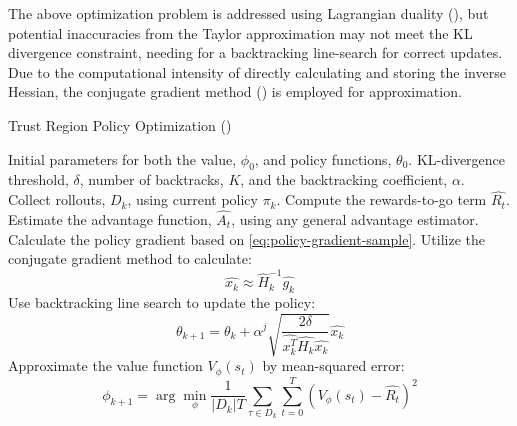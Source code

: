             \noindent The above optimization problem is addressed using Lagrangian duality (\cite{KnowlesLagrangianDuality}), but potential inaccuracies from the Taylor approximation may not meet the KL divergence constraint, needing for a backtracking line-search for correct updates. Due to the computational intensity of directly calculating and storing the inverse Hessian, the conjugate gradient method (\cite{conjugate}) is employed for approximation.
            
            \begin{algorithm}[ht]
            \caption{Trust Region Policy Optimization (\cite{schulman2017trust})} 
            \label{alg:TRPO}
            
            \begin{algorithmic}[1]
            \State {} Initial parameters for both the value, $\phi_0$, and policy functions, $\theta_0$.
            \State {} KL-divergence threshold, $\delta$, number of backtracks, $K$, and the backtracking coefficient, $\alpha$.
            \For{}
                \State Collect rollouts, $D_k$, using current policy $\pi_k$.
                \State Compute the rewards-to-go term $\hat{R_t}$. 
                \State Estimate the advantage function, $\hat{A_t}$, using any general advantage estimator.
                \State Calculate the policy gradient based on \textcolor{deepblue}{\autoref{eq:policy-gradient-sample}}.
                \State Utilize the conjugate gradient method to calculate:
                \begin{equation*}
                \hat{x_k} \approx \hat{H}^{-1}_{k} \hat{g_k}
                \end{equation*}
                \State Use backtracking line search to update the policy:
                \begin{equation*}
                \theta_{k+1} = \theta_k + \alpha^j \sqrt{\frac{2\delta}{\hat{x_k^T} \hat{H_k} \hat{x_k}}} \hat{x_k} 
                \end{equation*}
                \State Approximate the value function $V_{\phi}(s_t)$ by mean-squared error:
                \begin{equation*}
                \phi_{k+1} = \arg \min_{\phi} \frac{1}{|D_k| T} \sum_{\tau \in D_k} \sum_{t=0}^{T} \left( V_\phi(s_t) - \hat{R_t} \right)^2
                \end{equation*}
            \EndFor
            \end{algorithmic}
            \end{algorithm}

